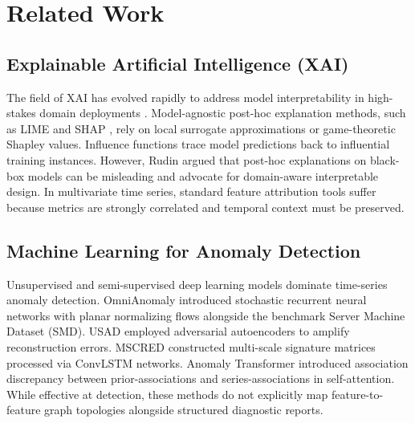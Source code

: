 \documentclass[conference]{IEEEtran}
\begin{document}
\section{Related Work}

\subsection{Explainable Artificial Intelligence (XAI)}
The field of XAI has evolved rapidly to address model interpretability in high-stakes domain deployments \cite{barredo2020explainable}. Model-agnostic post-hoc explanation methods, such as LIME \cite{ribeiro2016why} and SHAP \cite{lundberg2017unified}, rely on local surrogate approximations or game-theoretic Shapley values. Influence functions \cite{koh2017understanding} trace model predictions back to influential training instances. However, Rudin \cite{rudin2019stop} argued that post-hoc explanations on black-box models can be misleading and advocate for domain-aware interpretable design. In multivariate time series, standard feature attribution tools suffer because metrics are strongly correlated and temporal context must be preserved.

\subsection{Machine Learning for Anomaly Detection}
Unsupervised and semi-supervised deep learning models dominate time-series anomaly detection. OmniAnomaly \cite{su2019omnianomaly} introduced stochastic recurrent neural networks with planar normalizing flows alongside the benchmark Server Machine Dataset (SMD). USAD \cite{audibert2020usad} employed adversarial autoencoders to amplify reconstruction errors. MSCRED \cite{zhang2019deep} constructed multi-scale signature matrices processed via ConvLSTM networks. Anomaly Transformer \cite{xu2022anomaly} introduced association discrepancy between prior-associations and series-associations in self-attention. While effective at detection, these methods do not explicitly map feature-to-feature graph topologies alongside structured diagnostic reports.
\end{document}
